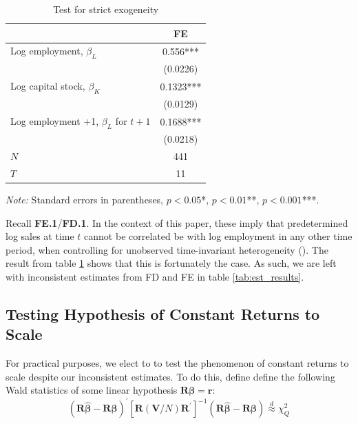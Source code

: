 \documentclass[11pt]{article}
\begin{document}
\begin{table}[H]
    \centering
    \caption{Test for strict exogeneity}
    \label{tab:strict_exo}
    \begin{threeparttable}
        \begin{tabular}{lc}
        \toprule
                                                    & FE       \\
        \midrule
        Log employment, $\beta_L$                    &  0.556*** \\
                                                     &  (0.0226) \\
        Log capital stock, $\beta_K$                &  0.1323*** \\
                                                     &  (0.0129) \\
        Log employment +1, $\beta_L$ for $t+1$      &  0.1688*** \\
                                                 &  (0.0218) \\
                                \midrule
        $N$                                         &        441 \\
        $T$                                        &         11  \\
        \bottomrule
        \end{tabular}
            \begin{tablenotes}
                \footnotesize \textit{Note:} Standard errors in parentheses, $p<0.05$*, $p<0.01$**, $p<0.001$***.
            \end{tablenotes}
    \end{threeparttable}
\end{table}

Recall \textbf{FE.1}/\textbf{FD.1}. In the context of this paper, these imply that predetermined log sales at time $t$ cannot be correlated be with log employment in any other time period, when controlling for unobserved time-invariant heterogeneity (\cite{Wooldridge_2016_serial_corr}). The result from table \ref{tab:strict_exo} shows that this is fortunately the case. As such, we are left with inconsistent estimates from FD and FE in table \ref{tab:est_results}.

\subsection{Testing Hypothesis of Constant Returns to Scale}
For practical purposes, we elect to to test the phenomenon of constant returns to scale despite our inconsistent estimates. To do this, define define the following Wald statistics of some linear hypothesis $\mathbf{R\beta=r}$:
\begin{equation*}
    (\mathbf{R} \widehat{\boldsymbol{\beta}}-\mathbf{R} \boldsymbol{\beta})^{\prime}\left[\mathbf{R}(\mathbf{V} / N) \mathbf{R}^{\prime}\right]^{-1}(\mathbf{R} \widehat{\boldsymbol{\beta}}-\mathbf{R} \boldsymbol{\beta}) \stackrel{d}{\approx} \chi_Q^2
\end{equation*}
\end{document}
